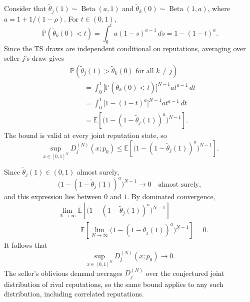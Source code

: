 \documentclass[11pt]{article}
\newcommand{\Pb}{\mathbb P}
\newcommand{\E}{\mathbb E}
\DeclareMathOperator{\Beta}{Beta}
\begin{document}
Consider that $\widetilde\theta_j(1)\sim\Beta(a,1)$ and
$\widetilde\theta_k(0)\sim\Beta(1,a)$, where $a=1+1/(1-\rho)$.
For $t\in(0,1)$,
\begin{equation}
\Pb(\widetilde\theta_k(0)<t)
=\int_0^t a(1-s)^{a-1}\,ds
=1-(1-t)^a.
\end{equation}
Since the TS draws are independent conditional on reputations, averaging
over seller $j$'s draw gives
\begin{equation}
\begin{aligned}
&\Pb(\widetilde\theta_j(1)>\widetilde\theta_k(0)
\text{ for all }k\neq j)\\
&\qquad=\int_0^1
\big[\Pb(\widetilde\theta_k(0)<t)\big]^{N-1}
a t^{a-1}\,dt\\
&\qquad=\int_0^1\big[1-(1-t)^a\big]^{N-1}a t^{a-1}\,dt\\
&\qquad=\E\!\left[
\big(1-(1-\widetilde\theta_j(1))^a\big)^{N-1}\right].
\end{aligned}
\end{equation}
The bound is valid at every joint reputation state, so
\begin{equation}
\sup_{x\in[0,1]^N}D_j^{(N)}(x;p_0)
\leq\E\!\left[
\big(1-(1-\widetilde\theta_j(1))^a\big)^{N-1}\right].
\end{equation}

Since $\widetilde\theta_j(1)\in(0,1)$ almost surely,
\begin{equation}
\big(1-(1-\widetilde\theta_j(1))^a\big)^{N-1}
\longrightarrow0\quad\text{almost surely},
\end{equation}
and this expression lies between $0$ and $1$. By dominated convergence,
\begin{equation}
\begin{aligned}
&\lim_{N\to\infty}\E\!\left[
\big(1-(1-\widetilde\theta_j(1))^a\big)^{N-1}\right]\\
&\qquad=\E\!\left[
\lim_{N\to\infty}
\big(1-(1-\widetilde\theta_j(1))^a\big)^{N-1}\right]=0.
\end{aligned}
\end{equation}
It follows that
\begin{equation}
\sup_{x\in[0,1]^N}D_j^{(N)}(x;p_0)\longrightarrow0.
\end{equation}
The seller's oblivious demand averages $D_j^{(N)}$ over the conjectured
joint distribution of rival reputations, so the same bound applies to
any such distribution, including correlated reputations.
\end{document}
